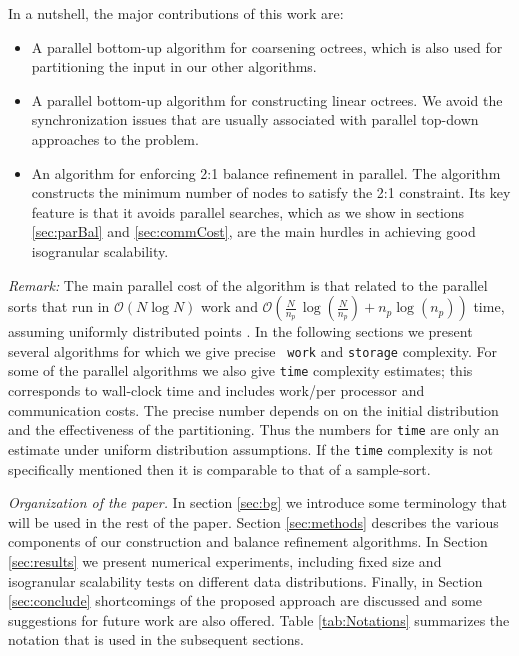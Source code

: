 In a nutshell, the major contributions of this work are:
\begin{itemize}	
	\item A parallel bottom-up algorithm for coarsening octrees,
	which is also used for partitioning the input in our other
	algorithms.
	\item A parallel bottom-up algorithm for constructing linear
	octrees. We avoid the synchronization issues that are usually
	associated with parallel top-down approaches to the problem.
	\item An algorithm for enforcing 2:1 balance refinement in
	parallel. The algorithm constructs the minimum number of nodes to
	satisfy the 2:1 constraint. Its key feature is that it avoids
	parallel searches, which as we show in sections \ref{sec:parBal}
	and \ref{sec:commCost}, are the main hurdles in achieving good
	isogranular scalability.
\end{itemize}

{\em Remark:} The main parallel cost of the algorithm is that related
to the parallel sorts that run in ${\mathcal O}(N \log N)$ work and
${\mathcal O}(\frac{N}{n_p}\, \log(\frac{N}{n_p}) + n_p \log(n_p))$ time, assuming
uniformly distributed points \cite{karypis03}.  In the following
sections we present several algorithms for which we give precise {\tt
work} and {\tt storage} complexity. For some of the parallel
algorithms we also give {\tt time} complexity estimates; this
corresponds to wall-clock time and includes work/per processor and
communication costs. The precise number depends on on the initial
distribution and the effectiveness of the partitioning. Thus the
numbers for {\tt time} are only an estimate under uniform distribution
assumptions. If the {\tt time} complexity is not specifically
mentioned then it is comparable to that of a sample-sort.

{\em{Organization of the paper.}} In section \ref{sec:bg} we introduce
some terminology that will be used in the rest of the paper. Section
\ref{sec:methods} describes the various components of our construction
and balance refinement algorithms. In Section \ref{sec:results} we
present numerical experiments, including fixed size and isogranular
scalability tests on different data distributions. Finally, in Section
\ref{sec:conclude} shortcomings of the proposed approach are discussed
and some suggestions for future work are also offered. Table
\ref{tab:Notations} summarizes the notation that is used in the
subsequent sections.

